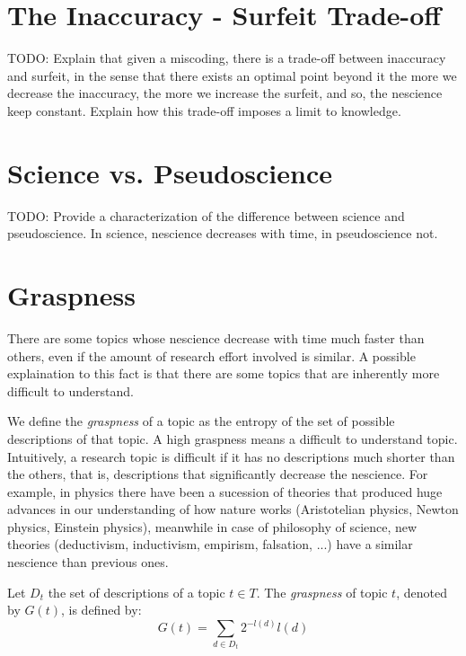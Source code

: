 %
%

\section{The Inaccuracy - Surfeit Trade-off}

{\color{red} TODO: Explain that given a miscoding, there is a trade-off between inaccuracy and surfeit, in the sense that there exists an optimal point beyond it the more we decrease the inaccuracy, the more we increase the surfeit, and so, the nescience keep constant. Explain how this trade-off imposes a limit to knowledge.}

%
%

\section{Science vs. Pseudoscience}

{\color{red} TODO: Provide a characterization of the difference between science and pseudoscience. In science, nescience decreases with time, in pseudoscience not.}

%
%
\section{Graspness}

There are some topics whose nescience decrease with time much faster than others, even if the amount of research effort involved is similar. A possible explaination to this fact is that there are some topics that are inherently more difficult to understand.

We define the \emph{graspness} of a topic as the entropy of the set of possible descriptions of that topic. A high graspness means a difficult to understand topic. Intuitively, a research topic is difficult if it has no descriptions much shorter than the others, that is, descriptions that significantly decrease the nescience. For example, in physics there have been a sucession of theories that produced huge advances in our understanding of how nature works (Aristotelian physics, Newton physics, Einstein physics), meanwhile in case of philosophy of science, new theories (deductivism, inductivism, empirism, falsation, ...) have a similar nescience than previous ones.

\begin{definition}[Graspness]
Let $D_t$ the set of descriptions of a topic $t \in T$. The \emph{graspness} of topic $t$, denoted by $G(t)$, is defined by:
\[
G(t) = \sum_{d \in D_t} 2^{-l(d)} l(d)
\]
\end{definition}

